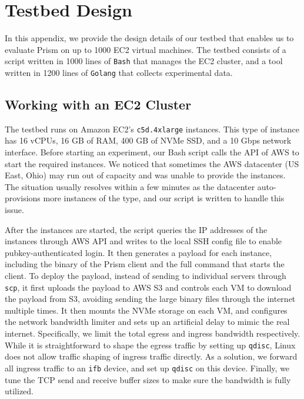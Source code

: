 \chapter{Testbed Design}
\label{apx:testbed}

In this appendix, we provide the design details of our testbed that enables us to evaluate Prism on up to 1000 EC2 virtual machines. The testbed consists of a script written in 1000 lines of \texttt{Bash} that manages the EC2 cluster, and a tool written in 1200 lines of \texttt{Golang} that collects experimental data.

\section{Working with an EC2 Cluster}

The testbed runs on Amazon EC2's \texttt{c5d.4xlarge} instances. This type of instance has 16 vCPUs, 16 GB of RAM, 400 GB of NVMe SSD, and a 10 Gbps network interface. Before starting an experiment, our Bash script calls the API of AWS to start the required instances. We noticed that sometimes the AWS datacenter (US East, Ohio) may run out of capacity and was unable to provide the instances. The situation usually resolves within a few minutes as the datacenter auto-provisions more instances of the type, and our script is written to handle this issue.

After the instances are started, the script queries the IP addresses of the instances through AWS API and writes to the local SSH config file to enable pubkey-authenticated login. It then generates a payload for each instance, including the binary of the Prism client and the full command that starts the client. To deploy the payload, instead of sending to individual servers through \texttt{scp}, it first uploads the payload to AWS S3 and controls each VM to download the payload from S3, avoiding sending the large binary files through the internet multiple times. It then mounts the NVMe storage on each VM, and configures the network bandwidth limiter and sets up an artificial delay to mimic the real internet. Specifically, we limit the total egress and ingress bandwidth respectively. While it is straightforward to shape the egress traffic by setting up \texttt{qdisc}, Linux does not allow traffic shaping of ingress traffic directly. As a solution, we forward all ingress traffic to an \texttt{ifb} device, and set up \texttt{qdisc} on this device. Finally, we tune the TCP send and receive buffer sizes to make sure the bandwidth is fully utilized.

